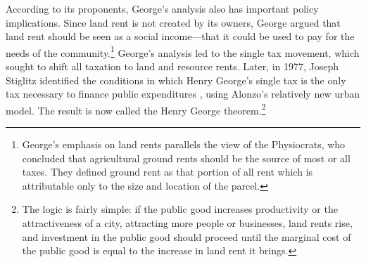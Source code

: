 According to its proponents, George's analysis also has important policy implications. Since land rent is not created by its owners, George argued that land rent should be seen as a social income---that it could be used to pay for the needs of the community.\footnote{George's emphasis on land rents parallels the view of the Physiocrats, who concluded that agricultural \gls{ground rents} should be the source of most or all taxes. They defined ground rent as that portion of all rent which is attributable only to the size and location of the parcel.} %
George's analysis led to the {single tax} movement, which sought to shift all taxation to land  and resource rents.  %
Later, in 1977, Joseph Stiglitz identified the conditions in which Henry George's \gls{single tax} is the only tax necessary to finance public expenditures \cite{GET-stliglits_henry-georege-1979}, using Alonzo's relatively new urban model. The result is now called the \gls{Henry George theorem}.\footnote{  %
The logic is fairly simple: if the public good increases productivity or the attractiveness of a city, attracting more people or businesses, land rents rise, and investment in the public good should proceed until the marginal cost of the public good is equal to the increase in land rent it brings.} %


